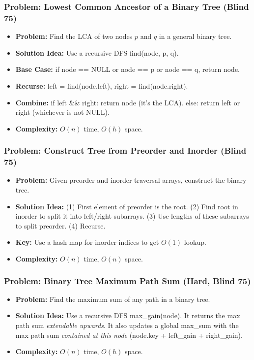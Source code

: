 \subsubsection{Problem: Lowest Common Ancestor of a Binary Tree (Blind 75)}
\begin{itemize}
\item \textbf{Problem:} Find the LCA of two nodes $p$ and $q$ in a general binary tree.
\item \textbf{Solution Idea:} Use a recursive DFS find(node, p, q).
\item \textbf{Base Case:} if node == NULL or node == p or node == q, return node.
\item \textbf{Recurse:} left = find(node.left), right = find(node.right).
\item \textbf{Combine:} if left \&\& right: return node (it's the LCA). else: return left or right (whichever is not NULL).
\item \textbf{Complexity:} $O(n)$ time, $O(h)$ space.
\end{itemize}

\subsubsection{Problem: Construct Tree from Preorder and Inorder (Blind 75)}
\begin{itemize}
\item \textbf{Problem:} Given preorder and inorder traversal arrays, construct the binary tree.
\item \textbf{Solution Idea:} (1) First element of preorder is the root. (2) Find root in inorder to split it into left/right subarrays. (3) Use lengths of these subarrays to split preorder. (4) Recurse.
\item \textbf{Key:} Use a hash map for inorder indices to get $O(1)$ lookup.
\item \textbf{Complexity:} $O(n)$ time, $O(n)$ space.
\end{itemize}

\subsubsection{Problem: Binary Tree Maximum Path Sum (Hard, Blind 75)}
\begin{itemize}
\item \textbf{Problem:} Find the maximum sum of any path in a binary tree.
\item \textbf{Solution Idea:} Use a recursive DFS max\_gain(node). It returns the max path sum \textit{extendable upwards}. It also updates a global max\_sum with the max path sum \textit{contained at this node} (node.key + left\_gain + right\_gain).
\item \textbf{Complexity:} $O(n)$ time, $O(h)$ space.
\end{itemize}


